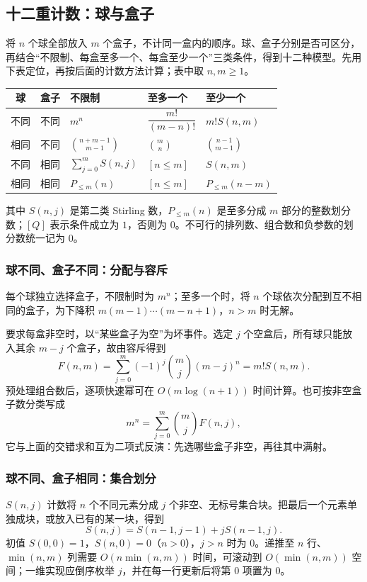 \subsection{十二重计数：球与盒子}
\label{math:twelvefold}
将 $n$ 个球全部放入 $m$ 个盒子，不计同一盒内的顺序。球、盒子分别是否可区分，再结合“不限制、每盒至多一个、每盒至少一个”三类条件，得到十二种模型。先用下表定位，再按后面的计数方法计算；表中取 $n,m\geq1$。

\begin{center}
\small
\renewcommand{\arraystretch}{1.5}
\begin{tabularx}{\linewidth}{@{}ccXXX@{}}
\toprule
球 & 盒子 & 不限制 & 至多一个 & 至少一个 \\
\midrule
不同 & 不同 & $m^n$ & $\dfrac{m!}{(m-n)!}$ & $m!S(n,m)$ \\
相同 & 不同 & $\binom{n+m-1}{m-1}$ & $\binom mn$ & $\binom{n-1}{m-1}$ \\
不同 & 相同 & $\sum_{j=0}^m S(n,j)$ & $[n\leq m]$ & $S(n,m)$ \\
相同 & 相同 & $P_{\leq m}(n)$ & $[n\leq m]$ & $P_{\leq m}(n-m)$ \\
\bottomrule
\end{tabularx}
\end{center}
其中 $S(n,j)$ 是第二类 Stirling 数，$P_{\leq m}(n)$ 是至多分成 $m$ 部分的整数划分数；$[Q]$ 表示条件成立为 $1$，否则为 $0$。不可行的排列数、组合数和负参数的划分数统一记为 $0$。

\subsubsection*{球不同、盒子不同：分配与容斥}
每个球独立选择盒子，不限制时为 $m^n$；至多一个时，将 $n$ 个球依次分配到互不相同的盒子，为下降积 $m(m-1)\cdots(m-n+1)$，$n>m$ 时无解。

要求每盒非空时，以“某些盒子为空”为坏事件。选定 $j$ 个空盒后，所有球只能放入其余 $m-j$ 个盒子，故由容斥得到
\[
    F(n,m)=\sum_{j=0}^m(-1)^j\binom mj(m-j)^n=m!S(n,m).
\]
预处理组合数后，逐项快速幂可在 $O(m\log(n+1))$ 时间计算。也可按非空盒子数分类写成
\[
    m^n=\sum_{j=0}^m\binom mj F(n,j),
\]
它与上面的交错求和互为二项式反演：先选哪些盒子非空，再往其中满射。

\subsubsection*{球不同、盒子相同：集合划分}
$S(n,j)$ 计数将 $n$ 个不同元素分成 $j$ 个非空、无标号集合块。把最后一个元素单独成块，或放入已有的某一块，得到
\[
    S(n,j)=S(n-1,j-1)+jS(n-1,j).
\]
初值 $S(0,0)=1$，$S(n,0)=0$（$n>0$），$j>n$ 时为 $0$。递推至 $n$ 行、$\min(n,m)$ 列需要 $O(n\min(n,m))$ 时间，可滚动到 $O(\min(n,m))$ 空间；一维实现应倒序枚举 $j$，并在每一行更新后将第 $0$ 项置为 $0$。

